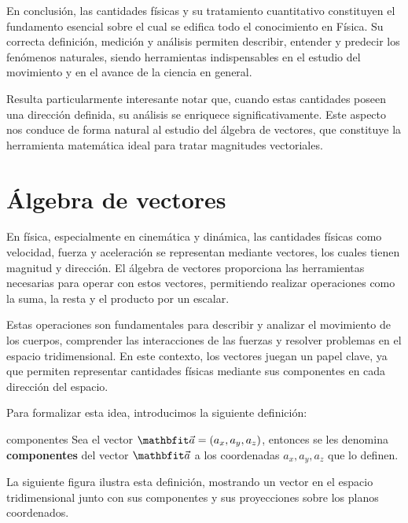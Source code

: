 En conclusión, las cantidades físicas y su tratamiento cuantitativo constituyen el fundamento esencial sobre el cual se edifica todo el conocimiento en Física. Su correcta definición, medición y análisis permiten describir, entender y predecir los fenómenos naturales, siendo herramientas indispensables en el estudio del movimiento y en el avance de la ciencia en general.

Resulta particularmente interesante notar que, cuando estas cantidades poseen una dirección definida, su análisis se enriquece significativamente. Este aspecto nos conduce de forma natural al estudio del álgebra de vectores, que constituye la herramienta matemática ideal para tratar magnitudes vectoriales.

\section{Álgebra de vectores}

En física, especialmente en cinemática y dinámica, las cantidades físicas como velocidad, fuerza y aceleración se representan mediante vectores, los cuales tienen magnitud y dirección. El álgebra de vectores proporciona las herramientas necesarias para operar con estos vectores, permitiendo realizar operaciones como la suma, la resta y el producto por un escalar.

Estas operaciones son fundamentales para describir y analizar el movimiento de los cuerpos, comprender las interacciones de las fuerzas y resolver problemas en el espacio tridimensional. En este contexto, los vectores juegan un papel clave, ya que permiten representar cantidades físicas mediante sus componentes en cada dirección del espacio.

Para formalizar esta idea, introducimos la siguiente definición:

\begin{definition}{}{componentes}
    Sea el vector $\veca = (a_x, a_y, a_z)$, entonces se les denomina \textbf{componentes} del vector $\veca$ a los coordenadas $a_x, a_y, a_z$ que lo definen.
\end{definition}

La siguiente figura ilustra esta definición, mostrando un vector en el espacio tridimensional junto con sus componentes y sus proyecciones sobre los planos coordenados.

